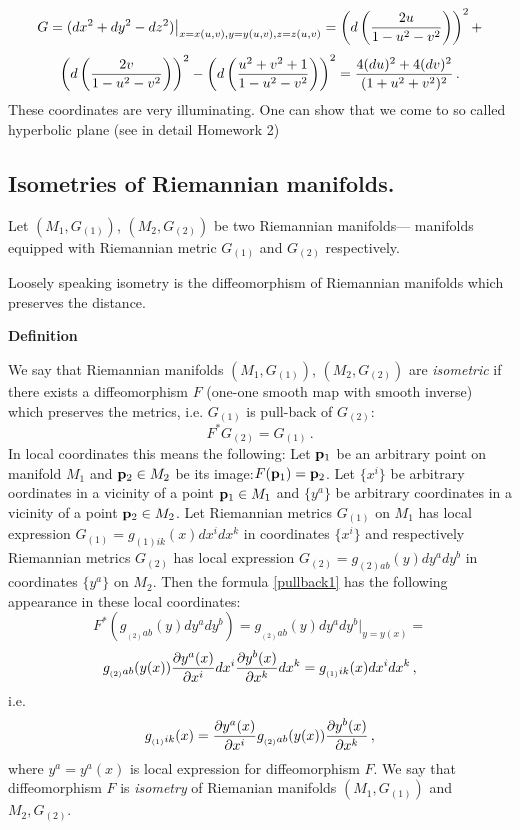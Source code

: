 \documentclass[12pt]{article}
\theoremstyle{theorem}
\numberwithin{equation}{section}
\begin{document}
{    $$
                         G=(dx^2+dy^2-dz^2)\big\vert_{x=x(u,v),y=y(u,v),z=z(u,v)}=
                     \left(d\left(2u\over 1-u^2-v^2\right)\right)^2+
                     $$
                     $$
                     \left(d\left(2v\over 1-u^2-v^2\right)\right)^2-
         \left(d\left(u^2+v^2+1\over 1-u^2-v^2\right)\right)^2=
            {4(du)^2+4(dv)^2\over (1+u^2+v^2)^2}\,.
    $$
These coordinates are very illuminating. One can show that we come to so called
hyperbolic plane (see in detail Homework 2)






\subsection {Isometries of Riemannian manifolds.}


  Let $(M_1,G_{(1)})$, $(M_2,G_{(2)})$ be two Riemannian manifolds---
 manifolds equipped
with Riemannian metric $G_{(1)}$ and $G_{(2)}$ respectively.

Loosely  speaking isometry is the
diffeomorphism of Riemannian manifolds which preserves the distance.



{\bf Definition}

We say that Riemannian manifolds
 $(M_1,G_{(1)})$, $(M_2,G_{(2)})$ are {\it isometric} if
there exists a diffeomorphism $F$
(one-one smooth map with smooth inverse)
which preserves the metrics, i.e.
$G_{(1)}$ is pull-back of $G_{(2)}$:
              \begin{equation}\label{pullback1}
            F^*G_{(2)}=G_{(1)}\,.
               \end{equation}
  In local coordinates this means the following:
  Let ${\bf p}_1$ be an arbitrary point on manifold $M_1$
and ${\bf p}_2\in M_2$ be its image:$F({\bf p}_1)={\bf p}_2$.
      Let $\{x^i\}$ be arbitrary
oordinates in a vicinity of a point ${\bf p}_1\in M_1$
      and $\{y^a\}$ be arbitrary
 coordinates in a vicinity of a point ${\bf p}_2\in M_2$.
      Let  Riemannian  metrics  $G_{(1)}$ on $M_1$
  has local expression
      $G_{(1)}=g_{(1)ik}(x)dx^idx^k$ in coordinates $\{x^i\}$
 and respectively
      Riemannian  metrics  $G_{(2)}$ has local expression
      $G_{(2)}=g_{(2)ab}(y)dy^ady^b$ in coordinates $\{y^a\}$ on $M_2$.
                 Then the formula \eqref{pullback1} has the following
appearance in these local coordinates:
                 $$
      F^*\left(g_{_{(2)}ab}(y)dy^a dy^b\right)=
       g_{_{(2)}ab}(y)dy^a dy^b\big\vert_{y=y(x)}=
                 $$
                \begin{equation}\label{transformationlaw}
               g_{_{(2)}ab}(y(x))
   {\partial y^a(x)\over \partial x^i}dx^i{\partial y^b(x)\over \partial x^k}dx^k
   =g_{_{(1)}ik}(x)dx^idx^k\,,
               \end{equation}
    i.e.  \begin{equation}\label{transformationlaw2}
   g_{_{(1)}ik}(x)={\partial y^a(x)\over \partial x^i}g_{_{(2)}ab}(y(x))
        {\partial y^b(x)\over \partial x^k}\,,
                 \end{equation}
 where $y^a=y^a(x)$ is local expression for diffeomorphism  $F$.
We say that diffeomorphism $F$ is {\it isometry}
 of Riemanian manifolds
$(M_1, G_{(1)})$ and $M_2,G_{(2)}$.

}
\end{document}
